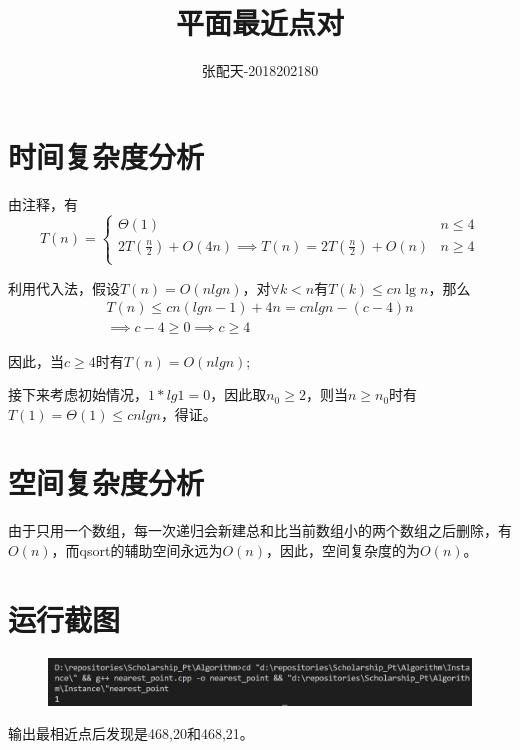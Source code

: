 \documentclass[UTF8]{ctexart}
\title{平面最近点对}
\author{张配天-2018202180}
\begin{document}
    \maketitle
    \section{时间复杂度分析}
    由注释，有
    \begin{equation}
        T(n) = \begin{cases}
            \Theta(1)&n\le 4\\
            2T(\frac{n}{2})+O(4n) \implies T(n) = 2T(\frac{n}{2}) + O(n) & n \ge 4\\
        \end{cases}
    \end{equation}
    
    \par 利用代入法，假设$T(n) = O(nlgn)$，对$\forall k < n$有$T(k) \leq cn\lg{n}$，那么
    \begin{gather*}
        T(n) \leq cn(lgn - 1) + 4n = cnlgn - (c-4)n\\
        \implies c-4 \ge 0\implies c \ge 4
    \end{gather*}
    \par 因此，当$c\ge 4$时有$T(n) = O(nlgn)$;
    \par 接下来考虑初始情况，$1*lg1 = 0$，因此取$n_0 \ge 2$，则当$n\ge n_0$时有$T(1) = \Theta(1) \leq cnlgn$，得证。
    \section{空间复杂度分析}
    由于只用一个数组，每一次递归会新建总和比当前数组小的两个数组之后删除，有$O(n)$，而qsort的辅助空间永远为$O(n)$，因此，空间复杂度的为$O(n)$。
    \section{运行截图}
    \begin{figure}[H]
        \centering
        \includegraphics[width=18cm]{resources/1.png}
    \end{figure}
    \par 输出最相近点后发现是468,20和468,21。
\end{document}
